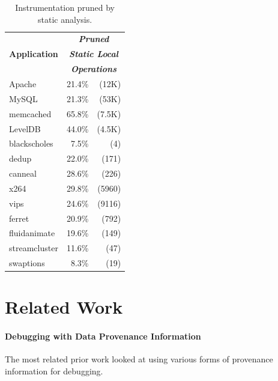 \documentclass[preprint,9pt]{sigplanconf}
\begin{document}
\begin{table}[htb]
\centering
\small
\begin{tabular}{l | r r }
\multirow{3}{*}{\bf Application} & \multicolumn{2}{c}{\bf \em Pruned } \\
               & \multicolumn{2}{c}{\bf \em Static Local}  \\ 
               & \multicolumn{2}{c}{\bf \em Operations}    \\ \hline


Apache         &  21.4\%&(12K)                    \\
MySQL          &  21.3\%&(53K)                    \\
memcached      &  65.8\%&(7.5K)                   \\
LevelDB        &  44.0\%&(4.5K)                   \\ \hline
blackscholes   &   7.5\%&(4)                      \\
dedup          &   22.0\%&(171)                   \\
canneal        &   28.6\%&(226)                   \\
x264           &   29.8\%&(5960)                  \\
vips           &   24.6\%&(9116)                  \\
ferret         &   20.9\%&(792)                   \\
fluidanimate   &   19.6\%&(149)                   \\
streamcluster  &   11.6\%&(47)                    \\
swaptions      &   8.3\% &(19)                    \\
\end{tabular}
\caption{\label{tab:char}Instrumentation pruned by static analysis.}
\end{table}


\section{Related Work}

\paragraph{Debugging with Data Provenance Information}
The most related prior work looked at using various forms of provenance information for debugging.
\end{document}
